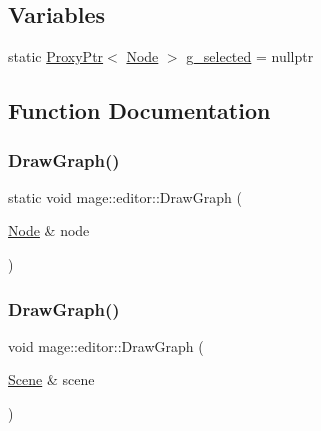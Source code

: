 \subsection*{Variables}
\begin{DoxyCompactItemize}
\item 
static \hyperlink{classmage_1_1_proxy_ptr}{Proxy\+Ptr}$<$ \hyperlink{classmage_1_1_node}{Node} $>$ \hyperlink{namespacemage_1_1editor_a07eeeb446dc1d39e1d6ffa06a6324570}{g\+\_\+selected} = nullptr
\end{DoxyCompactItemize}


\subsection{Function Documentation}
\hypertarget{namespacemage_1_1editor_a73bdc66f67454e7178d83f1bf32d273c}{}\label{namespacemage_1_1editor_a73bdc66f67454e7178d83f1bf32d273c} 
\subsubsection{\texorpdfstring{Draw\+Graph()}{DrawGraph()}\hspace{0.1cm}{\footnotesize\ttfamily [1/2]}}
{\footnotesize\ttfamily static void mage\+::editor\+::\+Draw\+Graph (\begin{DoxyParamCaption}\item[{\hyperlink{classmage_1_1_node}{Node} \&}]{node }\end{DoxyParamCaption})\hspace{0.3cm}{\ttfamily [static]}}

\hypertarget{namespacemage_1_1editor_aeff2b7b5e4be51f68c9c4a6b7a1f411a}{}\label{namespacemage_1_1editor_aeff2b7b5e4be51f68c9c4a6b7a1f411a} 
\subsubsection{\texorpdfstring{Draw\+Graph()}{DrawGraph()}\hspace{0.1cm}{\footnotesize\ttfamily [2/2]}}
{\footnotesize\ttfamily void mage\+::editor\+::\+Draw\+Graph (\begin{DoxyParamCaption}\item[{\hyperlink{classmage_1_1_scene}{Scene} \&}]{scene }\end{DoxyParamCaption})}

